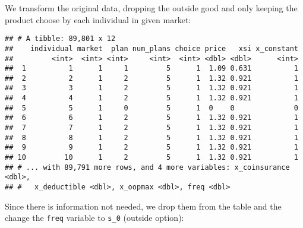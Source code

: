 \documentclass[]{article}
\newenvironment{Shaded}{\begin{snugshade}}{\end{snugshade}}
\newcommand{\DataTypeTok}[1]{\textcolor[rgb]{0.13,0.29,0.53}{#1}}
\newcommand{\DecValTok}[1]{\textcolor[rgb]{0.00,0.00,0.81}{#1}}
\newcommand{\KeywordTok}[1]{\textcolor[rgb]{0.13,0.29,0.53}{\textbf{#1}}}
\newcommand{\NormalTok}[1]{#1}
\newcommand{\OperatorTok}[1]{\textcolor[rgb]{0.81,0.36,0.00}{\textbf{#1}}}
\newcommand{\StringTok}[1]{\textcolor[rgb]{0.31,0.60,0.02}{#1}}
\begin{document}
We transform the original data, dropping the outside good and only
keeping the product choose by each individual in given market:

\begin{Shaded}
\end{Shaded}

\begin{verbatim}
## # A tibble: 89,801 x 12
##    individual market  plan num_plans choice price   xsi x_constant
##         <int>  <int> <int>     <int>  <int> <dbl> <dbl>      <int>
##  1          1      1     1         5      1  1.09 0.631          1
##  2          2      1     2         5      1  1.32 0.921          1
##  3          3      1     2         5      1  1.32 0.921          1
##  4          4      1     2         5      1  1.32 0.921          1
##  5          5      1     0         5      1  0    0              0
##  6          6      1     2         5      1  1.32 0.921          1
##  7          7      1     2         5      1  1.32 0.921          1
##  8          8      1     2         5      1  1.32 0.921          1
##  9          9      1     2         5      1  1.32 0.921          1
## 10         10      1     2         5      1  1.32 0.921          1
## # ... with 89,791 more rows, and 4 more variables: x_coinsurance <dbl>,
## #   x_deductible <dbl>, x_oopmax <dbl>, freq <dbl>
\end{verbatim}

Since there is information not needed, we drop them from the table and
the change the \texttt{freq} variable to \texttt{s\_0} (outside option):

\begin{Shaded}
\end{Shaded}
\end{document}
